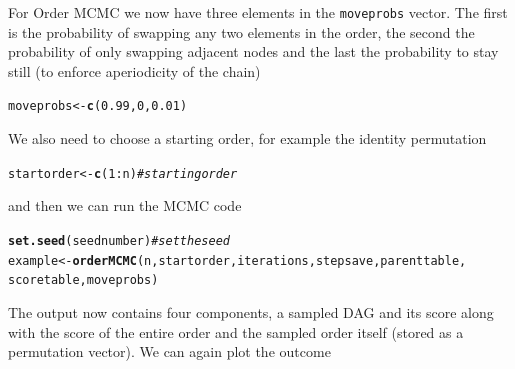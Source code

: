 \documentclass[a4paper]{article}\usepackage[]{graphicx}\usepackage[]{color}
\makeatletter
\newcommand{\hlnum}[1]{\textcolor[rgb]{0.686,0.059,0.569}{#1}}%
\newcommand{\hlcom}[1]{\textcolor[rgb]{0.678,0.584,0.686}{\textit{#1}}}%
\newcommand{\hlopt}[1]{\textcolor[rgb]{0,0,0}{#1}}%
\newcommand{\hlstd}[1]{\textcolor[rgb]{0.345,0.345,0.345}{#1}}%
\newcommand{\hlkwb}[1]{\textcolor[rgb]{0.69,0.353,0.396}{#1}}%
\newcommand{\hlkwd}[1]{\textcolor[rgb]{0.737,0.353,0.396}{\textbf{#1}}}%
\newenvironment{kframe}{%
 \def\at@end@of@kframe{}%
 \ifinner\ifhmode%
  \def\at@end@of@kframe{\end{minipage}}%
  \begin{minipage}{\columnwidth}%
 \fi\fi%
 \def\FrameCommand##1{\hskip\@totalleftmargin \hskip-\fboxsep
 \colorbox{shadecolor}{##1}\hskip-\fboxsep
     \hskip-\linewidth \hskip-\@totalleftmargin \hskip\columnwidth}%
 \MakeFramed {\advance\hsize-\width
   \@totalleftmargin\z@ \linewidth\hsize
   \@setminipage}}%
 {\par\unskip\endMakeFramed%
 \at@end@of@kframe}
\newenvironment{knitrout}{}{} %
\newcommand{\nn}{\noindent}
\makeatother
\begin{document}
\nn For Order MCMC we now have three elements in the \texttt{moveprobs} vector.  The first is the probability of swapping any two elements in the order, the second the probability of only swapping adjacent nodes and the last the probability to stay still (to enforce aperiodicity of the chain)

\begin{knitrout}
\color{fgcolor}\begin{kframe}
\begin{alltt}
\hlstd{moveprobs} \hlkwb{<-} \hlkwd{c}\hlstd{(}\hlnum{0.99}\hlstd{,} \hlnum{0}\hlstd{,} \hlnum{0.01}\hlstd{)}
\end{alltt}
\end{kframe}
\end{knitrout}

\nn We also need to choose a starting order, for example the identity permutation

\begin{knitrout}
\color{fgcolor}\begin{kframe}
\begin{alltt}
\hlstd{startorder} \hlkwb{<-} \hlkwd{c}\hlstd{(}\hlnum{1}\hlopt{:}\hlstd{n)}  \hlcom{# starting order}
\end{alltt}
\end{kframe}
\end{knitrout}

\nn and then we can run the MCMC code

\begin{knitrout}
\color{fgcolor}\begin{kframe}
\begin{alltt}
\hlkwd{set.seed}\hlstd{(seednumber)}  \hlcom{# set the seed}
\hlstd{example} \hlkwb{<-} \hlkwd{orderMCMC}\hlstd{(n, startorder, iterations, stepsave, parenttable,}
    \hlstd{scoretable, moveprobs)}
\end{alltt}
\end{kframe}
\end{knitrout}

\nn The output now contains four components, a sampled DAG and its score along with the score of the entire order and the sampled order itself (stored as a permutation vector).  We can again plot the outcome
\end{document}
